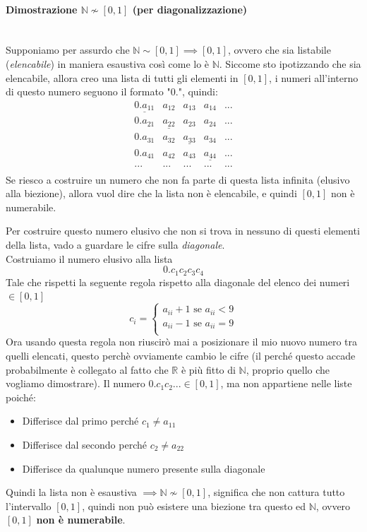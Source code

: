 \documentclass{article}
\begin{document}
\paragraph{Dimostrazione $\mathbb{N}\nsim[0,1]$ (per diagonalizzazione)}\mbox{}\\Supponiamo per assurdo che $\mathbb{N}\sim[0,1]\implies[0,1]$,
ovvero che sia listabile (\textit{elencabile}) in maniera esaustiva così come lo è $\mathbb{N}$.
Siccome sto ipotizzando che sia elencabile, allora creo una lista di tutti gli elementi in $[0,1]$, i numeri
all'interno di questo numero seguono il formato "$0.$", quindi:
\[
    \begin{array}{ccccc}
        \underline{0.a_{11}} & a_{12}             & a_{13}             & a_{14}             & ... \\
        0.a_{21}             & \underline{a_{22}} & a_{23}             & a_{24}             & ... \\
        0.a_{31}             & a_{32}             & \underline{a_{33}} & a_{34}             & ... \\
        0.a_{41}             & a_{42}             & a_{43}             & \underline{a_{44}} & ... \\
        ...                  & ...                  & ...                  & ...                  & ... \\
    \end{array}
\]
Se riesco a costruire un numero che non fa parte di questa lista infinita (elusivo alla biezione),
allora vuol dire che la lista non è elencabile, e quindi $[0,1]$ non è numerabile.

Per costruire questo numero elusivo che non si trova in nessuno di questi elementi della lista,
vado a guardare le cifre sulla \textit{diagonale}.\\Costruiamo il numero elusivo alla lista
$$0.c_1c_2c_3c_4$$
Tale che rispetti la seguente regola rispetto alla diagonale del elenco dei numeri $\in [0,1]$
\[
    c_i=
    \begin{cases}
        a_{ii} + 1\text{ se }a_{ii} < 9 \\
        a_{ii} - 1\text{ se }a_{ii} = 9 \\
    \end{cases}
\]
Ora usando questa regola non riuscirò mai a posizionare il mio nuovo numero
tra quelli elencati, questo perchè ovviamente cambio le cifre (il perché questo accade
probabilmente è collegato al fatto che $\mathbb{R}$ è più fitto di $\mathbb{N}$, proprio
quello che vogliamo dimostrare).
Il numero $0.c_1c_2...\in[0,1]$, ma non appartiene nelle liste poiché:
\begin{itemize}
    \item Differisce dal primo perché $c_1\neq a_{11}$
    \item Differisce dal secondo perché $c_2\neq a_{22}$
    \item Differisce da qualunque numero presente sulla diagonale
\end{itemize}
Quindi la lista non è esaustiva $\implies \mathbb{N}\nsim[0,1]$, significa che non cattura tutto l'intervallo $[0,1]$,
quindi non può esistere una biezione tra questo ed $\mathbb{N}$, ovvero $[0,1]$ \textbf{non è numerabile}.
\end{document}
